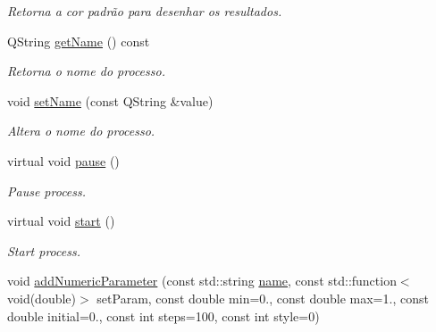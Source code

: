 \begin{DoxyCompactItemize}
\begin{DoxyCompactList}\small\item\em Retorna a cor padrão para desenhar os resultados. \end{DoxyCompactList}\item 
\hypertarget{class_process_control_aebd19108ae7957a2c5f4f55aa4a8737e}{}Q\+String \hyperlink{class_process_control_aebd19108ae7957a2c5f4f55aa4a8737e}{get\+Name} () const \label{class_process_control_aebd19108ae7957a2c5f4f55aa4a8737e}

\begin{DoxyCompactList}\small\item\em Retorna o nome do processo. \end{DoxyCompactList}\item 
\hypertarget{class_process_control_ae9b6ae8085e66d1a0440a443699b6e9a}{}void \hyperlink{class_process_control_ae9b6ae8085e66d1a0440a443699b6e9a}{set\+Name} (const Q\+String \&value)\label{class_process_control_ae9b6ae8085e66d1a0440a443699b6e9a}

\begin{DoxyCompactList}\small\item\em Altera o nome do processo. \end{DoxyCompactList}\item 
\hypertarget{class_process_control_a468fe2136e366509514bb38fed9d0102}{}virtual void \hyperlink{class_process_control_a468fe2136e366509514bb38fed9d0102}{pause} ()\label{class_process_control_a468fe2136e366509514bb38fed9d0102}

\begin{DoxyCompactList}\small\item\em Pause process. \end{DoxyCompactList}\item 
\hypertarget{class_process_control_a62b63bddf378b0e13a4affa3e8e1bedf}{}virtual void \hyperlink{class_process_control_a62b63bddf378b0e13a4affa3e8e1bedf}{start} ()\label{class_process_control_a62b63bddf378b0e13a4affa3e8e1bedf}

\begin{DoxyCompactList}\small\item\em Start process. \end{DoxyCompactList}\item 
\hypertarget{class_process_control_af1df9f770b44a1ec346c791f5bb72e32}{}void \hyperlink{class_process_control_af1df9f770b44a1ec346c791f5bb72e32}{add\+Numeric\+Parameter} (const std\+::string \hyperlink{class_process_control_abc29e461e01cc0c712944f8f47f91331}{name}, const std\+::function$<$ void(double)$>$ set\+Param, const double min=0., const double max=1., const double initial=0., const int steps=100, const int style=0)\label{class_process_control_af1df9f770b44a1ec346c791f5bb72e32}


\end{DoxyCompactItemize}
